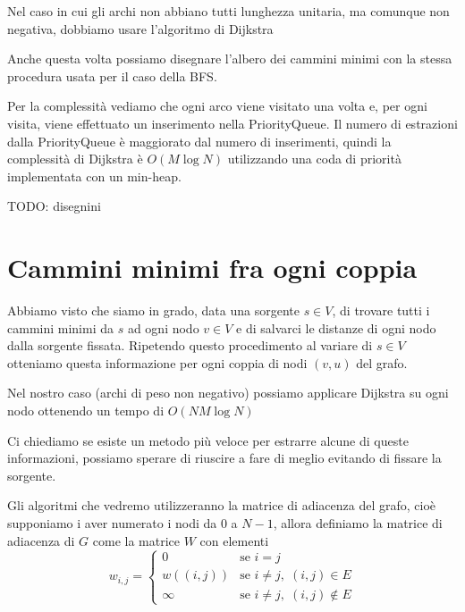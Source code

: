 \documentclass[a4paper,10pt]{amsbook}
\theoremstyle{plain}
\theoremstyle{definition}
\theoremstyle{remark}
\newcommand{\pa}[1]{\left(#1\right)}
\begin{document}
Nel caso in cui gli archi non abbiano tutti lunghezza unitaria, ma
comunque non negativa, dobbiamo usare l'algoritmo di Dijkstra

\begin{algorithmic}
  \EndFor
      \EndIf
    \EndFor
  \EndWhile
\end{algorithmic}

Anche questa volta possiamo disegnare l'albero dei cammini minimi con
la stessa procedura usata per il caso della BFS.

Per la complessit\`a vediamo che ogni arco viene visitato una volta e,
per ogni visita, viene effettuato un inserimento nella
PriorityQueue. Il numero di estrazioni dalla PriorityQueue \`e
maggiorato dal numero di inserimenti, quindi la complessit\`a di
Dijkstra \`e $O(M\log N)$ utilizzando una coda di priorit\`a
implementata con un min-heap.

TODO: disegnini

\section{Cammini minimi fra ogni coppia}

Abbiamo visto che siamo in grado, data una sorgente $s\in V$, di
trovare tutti i cammini minimi da $s$ ad ogni nodo $v\in V$ e di
salvarci le distanze di ogni nodo dalla sorgente fissata. Ripetendo
questo procedimento al variare di $s\in V$ otteniamo questa
informazione per ogni coppia di nodi $(v,u)$ del grafo.

Nel nostro caso (archi di peso non negativo) possiamo applicare
Dijkstra su ogni nodo ottenendo un tempo di $O(NM\log N)$

Ci chiediamo se esiste un metodo più veloce per estrarre alcune di
queste informazioni, possiamo sperare di riuscire a fare di meglio
evitando di fissare la sorgente.

Gli algoritmi che vedremo utilizzeranno la matrice di adiacenza del
grafo, cioè supponiamo i aver numerato i nodi da $0$ a $N-1$, allora
definiamo la matrice di adiacenza di $G$ come la matrice $W$ con
elementi
\[
  w_{i,j} = \left\{
    \begin{matrix}
      0 & \text{se } i = j \\
      w\pa{(i,j)} & \text{se } i\neq j,\; (i,j) \in E \\
      \infty & \text{se } i\neq j,\; (i,j) \not\in E
    \end{matrix}
  \right.
\]
\end{document}
